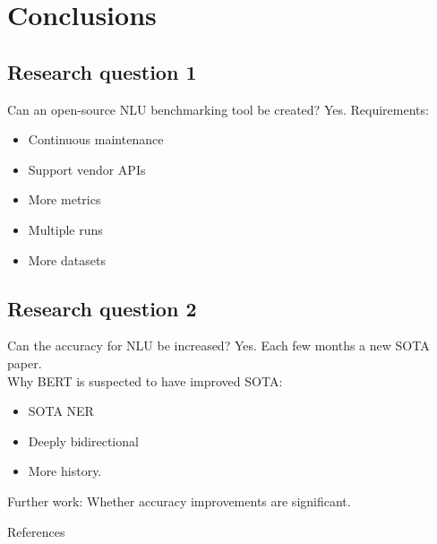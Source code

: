 \documentclass[pdf]{beamer}
\begin{document}
    \section{Conclusions}
    \subsection{Research question 1}
    \begin{frame}{Can an open-source NLU benchmarking tool be created?}
        Yes.
        Requirements:
        \begin{itemize}
            \item Continuous maintenance
            \item Support vendor APIs
            \item More metrics
            \item Multiple runs
            \item More datasets
        \end{itemize}
    \end{frame}

    \subsection{Research question 2}
    \begin{frame}{Can the accuracy for NLU be increased?}
        Yes.
        Each few months a new SOTA paper.\\[5mm]

        Why BERT is suspected to have improved SOTA:
        \begin{itemize}
            \item SOTA NER
            \item Deeply bidirectional
            \item More history.\\[5mm]
        \end{itemize}

        Further work: Whether accuracy improvements are significant.
    \end{frame}

   \begin{frame}[allowframebreaks]{References}
        \scriptsize
        
\end{frame}
\end{document}
